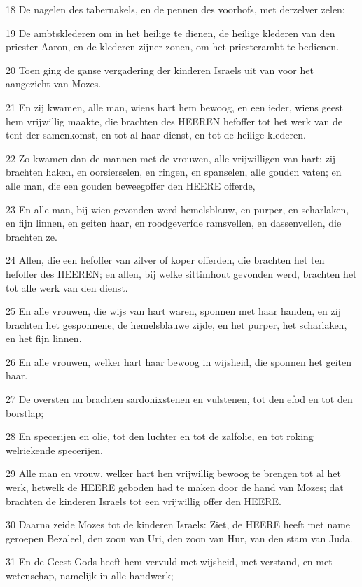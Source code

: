 \par 18 De nagelen des tabernakels, en de pennen des voorhofs, met derzelver zelen;
\par 19 De ambtsklederen om in het heilige te dienen, de heilige klederen van den priester Aaron, en de klederen zijner zonen, om het priesterambt te bedienen.
\par 20 Toen ging de ganse vergadering der kinderen Israels uit van voor het aangezicht van Mozes.
\par 21 En zij kwamen, alle man, wiens hart hem bewoog, en een ieder, wiens geest hem vrijwillig maakte, die brachten des HEEREN hefoffer tot het werk van de tent der samenkomst, en tot al haar dienst, en tot de heilige klederen.
\par 22 Zo kwamen dan de mannen met de vrouwen, alle vrijwilligen van hart; zij brachten haken, en oorsierselen, en ringen, en spanselen, alle gouden vaten; en alle man, die een gouden beweegoffer den HEERE offerde,
\par 23 En alle man, bij wien gevonden werd hemelsblauw, en purper, en scharlaken, en fijn linnen, en geiten haar, en roodgeverfde ramsvellen, en dassenvellen, die brachten ze.
\par 24 Allen, die een hefoffer van zilver of koper offerden, die brachten het ten hefoffer des HEEREN; en allen, bij welke sittimhout gevonden werd, brachten het tot alle werk van den dienst.
\par 25 En alle vrouwen, die wijs van hart waren, sponnen met haar handen, en zij brachten het gesponnene, de hemelsblauwe zijde, en het purper, het scharlaken, en het fijn linnen.
\par 26 En alle vrouwen, welker hart haar bewoog in wijsheid, die sponnen het geiten haar.
\par 27 De oversten nu brachten sardonixstenen en vulstenen, tot den efod en tot den borstlap;
\par 28 En specerijen en olie, tot den luchter en tot de zalfolie, en tot roking welriekende specerijen.
\par 29 Alle man en vrouw, welker hart hen vrijwillig bewoog te brengen tot al het werk, hetwelk de HEERE geboden had te maken door de hand van Mozes; dat brachten de kinderen Israels tot een vrijwillig offer den HEERE.
\par 30 Daarna zeide Mozes tot de kinderen Israels: Ziet, de HEERE heeft met name geroepen Bezaleel, den zoon van Uri, den zoon van Hur, van den stam van Juda.
\par 31 En de Geest Gods heeft hem vervuld met wijsheid, met verstand, en met wetenschap, namelijk in alle handwerk;
